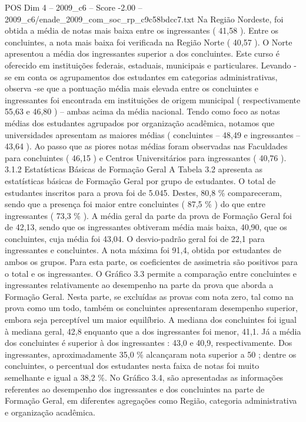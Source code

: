 \begin{textsample}{POS Dim 4 – 2009\_c6 – Score -2.00 – 2009\_c6/enade\_2009\_com\_soc\_rp\_c9c58bdcc7.txt}
Na Região Nordeste, foi obtida a média de notas mais baixa entre os ingressantes ( 41,58 ).
Entre os concluintes, a nota mais baixa foi verificada na Região Norte ( 40,57 ).
O Norte apresentou a média dos ingressantes superior a dos concluintes.
Este curso é oferecido em instituições federais, estaduais, municipais e particulares.
Levando -se em conta os agrupamentos dos estudantes em categorias administrativas, observa -se que a pontuação média mais elevada entre os concluintes e ingressantes foi encontrada em instituições de origem municipal ( respectivamente 55,63 e 46,80 ) – ambas acima da média nacional.
Tendo como foco as notas médias dos estudantes agrupados por organização acadêmica, notamos que universidades apresentam as maiores médias ( concluintes – 48,49 e ingressantes – 43,64 ).
Ao passo que as piores notas médias foram observadas nas Faculdades para concluintes ( 46,15 ) e Centros Universitários para ingressantes ( 40,76 ). 3.1.2 Estatísticas Básicas de Formação Geral A Tabela 3.2 apresenta as estatísticas básicas de Formação Geral por grupo de estudantes.
O total de estudantes inscritos para a prova foi de 5.045.
Destes, 80,8 \% compareceram, sendo que a presença foi maior entre concluintes ( 87,5 \% ) do que entre ingressantes ( 73,3 \% ).
A média geral da parte da prova de Formação Geral foi de 42,13, sendo que os ingressantes obtiveram média mais baixa, 40,90, que os concluintes, cuja média foi 43,04.
O desvio-padrão geral foi de 22,1 para ingressantes e concluintes.
A nota máxima foi 91,4, obtida por estudantes de ambos os grupos.
Para esta parte, os coeficientes de assimetria são positivos para o total e os ingressantes.
O Gráfico 3.3 permite a comparação entre concluintes e ingressantes relativamente ao desempenho na parte da prova que aborda a Formação Geral.
Nesta parte, se excluídas as provas com nota zero, tal como na prova como um todo, também os concluintes apresentaram desempenho superior, embora seja perceptível um maior equilíbrio.
A mediana dos concluintes foi igual à mediana geral, 42,8 enquanto que a dos ingressantes foi menor, 41,1.
Já a média dos concluintes é superior à dos ingressantes : 43,0 e 40,9, respectivamente.
Dos ingressantes, aproximadamente 35,0 \% alcançaram nota superior a 50 ; dentre os concluintes, o percentual dos estudantes nesta faixa de notas foi muito semelhante e igual a 38,2 \%.
No Gráfico 3.4, são apresentadas as informações referentes ao desempenho dos ingressantes e dos concluintes na parte de Formação Geral, em diferentes agregações como Região, categoria administrativa e organização acadêmica.

\end{textsample}
